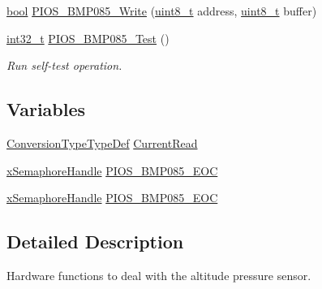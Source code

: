 \begin{DoxyCompactItemize}
\item 
\hyperlink{group___exported__types_gaf6a258d8f3ee5206d682d799316314b1}{bool} \hyperlink{group___p_i_o_s___b_m_p085_ga370cd53ce7074cb090f5231ba1644914}{P\-I\-O\-S\-\_\-\-B\-M\-P085\-\_\-\-Write} (\hyperlink{stdint_8h_aba7bc1797add20fe3efdf37ced1182c5}{uint8\-\_\-t} address, \hyperlink{stdint_8h_aba7bc1797add20fe3efdf37ced1182c5}{uint8\-\_\-t} buffer)
\item 
\hyperlink{group___n_a_m_e_gafd12020da5a235dfcf0c3c748fb5baed}{int32\-\_\-t} \hyperlink{group___p_i_o_s___b_m_p085_ga63112f7f2415c114d2c9042c1b3e8441}{P\-I\-O\-S\-\_\-\-B\-M\-P085\-\_\-\-Test} ()
\begin{DoxyCompactList}\small\item\em Run self-\/test operation. \end{DoxyCompactList}\end{DoxyCompactItemize}
\subsection*{Variables}
\begin{DoxyCompactItemize}
\item 
\hyperlink{group___p_i_o_s___b_m_p085_ga9cea215e6c64f123b3561819d5219785}{Conversion\-Type\-Type\-Def} \hyperlink{group___p_i_o_s___b_m_p085_ga1dd45e20832bd6d56c5bcc1b1773a204}{Current\-Read}
\item 
\hyperlink{_common_2_libraries_2_free_r_t_o_s_2_source_2include_2semphr_8h_aa91aa1b6835a184838f9ccf138a6ad10}{x\-Semaphore\-Handle} \hyperlink{group___p_i_o_s___b_m_p085_ga4dd7fe8ef562b12c78ad0cfc1bf1fd8e}{P\-I\-O\-S\-\_\-\-B\-M\-P085\-\_\-\-E\-O\-C}
\item 
\hyperlink{_common_2_libraries_2_free_r_t_o_s_2_source_2include_2semphr_8h_aa91aa1b6835a184838f9ccf138a6ad10}{x\-Semaphore\-Handle} \hyperlink{group___p_i_o_s___b_m_p085_ga4dd7fe8ef562b12c78ad0cfc1bf1fd8e}{P\-I\-O\-S\-\_\-\-B\-M\-P085\-\_\-\-E\-O\-C}
\end{DoxyCompactItemize}


\subsection{Detailed Description}
Hardware functions to deal with the altitude pressure sensor. 

